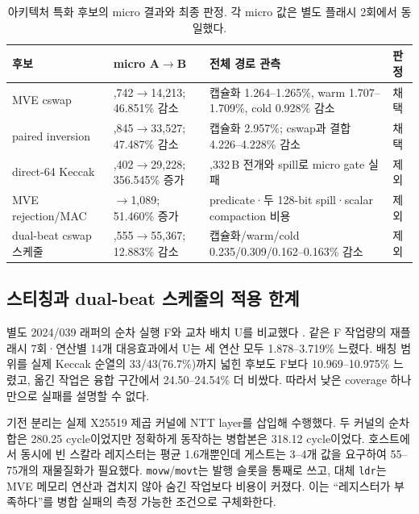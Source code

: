 \documentclass[runningheads,orivec]{llncs}
\begin{document}
\begin{table}[H]\centering\footnotesize
\caption{아키텍처 특화 후보의 micro 결과와 최종 판정. 각 micro 값은 별도 플래시
2회에서 동일했다.}
\label{tab:architecture-gates}
\renewcommand{\arraystretch}{1.12}
\begin{tabularx}{\textwidth}{@{}>{\raggedright\arraybackslash}p{2.65cm}>{\raggedright\arraybackslash}p{3.05cm}>{\raggedright\arraybackslash}X>{\raggedright\arraybackslash}p{1.3cm}@{}}\toprule
후보 & micro A$\to$B & 전체 경로 관측 & 판정\\\midrule
MVE cswap & 26,742$\to$14,213; 46.851\% 감소 & 캡슐화 1.264--1.265\%, warm 1.707--1.709\%, cold 0.928\% 감소 & 채택\\
paired inversion & 63,845$\to$33,527; 47.487\% 감소 & 캡슐화 2.957\%; cswap과 결합 4.226--4.228\% 감소 & 채택\\
direct-64 Keccak & 6,402$\to$29,228; 356.545\% 증가 & 1,332\,B 전개와 spill로 micro gate 실패 & 제외\\
MVE rejection/MAC & 719$\to$1,089; 51.460\% 증가 & predicate·두 128-bit spill·scalar compaction 비용 & 제외\\
dual-beat cswap 스케줄 & 63,555$\to$55,367; 12.883\% 감소 & 캡슐화/warm/cold 0.235/0.309/0.162--0.163\% 감소 & 제외\\\bottomrule
\end{tabularx}
\end{table}
\FloatBarrier

\subsection{스티칭과 dual-beat 스케줄의 적용 한계}\label{sec:auto}

별도 2024/039 래퍼의 순차 실행 F와 교차 배치 U를 비교했다
\cite{XWing24,Slothy22,SlothyM7_25}. 같은 F 작업량의 재플래시 7회·연산별 14개
대응효과에서 U는 세 연산 모두 1.878--3.719\% 느렸다. 배칭 범위를 실제 Keccak 순열의
33/43(76.7\%)까지 넓힌 후보도 F보다 10.969--10.975\% 느렸고, 옮긴 작업은 융합 구간에서
24.50--24.54\% 더 비쌌다. 따라서 낮은 coverage 하나만으로 실패를 설명할 수 없다.

기전 분리는 실제 X25519 제곱 커널에 NTT layer를 삽입해 수행했다. 두 커널의 순차 합은
280.25 cycle이었지만 정확하게 동작하는 병합본은 318.12 cycle이었다. 호스트에서 동시에
빈 스칼라 레지스터는 평균 1.6개뿐인데 게스트는 3--4개 값을 요구하여 55--75개의
재물질화가 필요했다. \texttt{movw}/\texttt{movt}는 발행 슬롯을 통째로 쓰고, 대체
\texttt{ldr}는 MVE 메모리 연산과 겹치지 않아 숨긴 작업보다 비용이 커졌다. 이는
``레지스터가 부족하다''를 병합 실패의 측정 가능한 조건으로 구체화한다.
\end{document}
